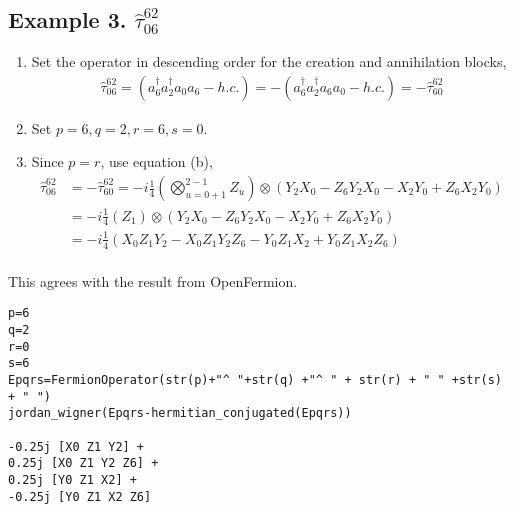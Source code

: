 \documentclass[prb,amsmath,amsfonts,amssymb]{revtex4}
\begin{document}
\subsection{Example 3. $\hat \tau_{06}^{62}$}
\begin{enumerate}
	\item Set the operator in descending order for the creation and annihilation blocks, 
\begin{align}\hat \tau_{06}^{62} =   \left(a_6^\dag a_2^\dag a_0 a_6 - h.c.\right) =  - \left(a_6^\dag a_2^\dag a_6 a_0 - h.c.\right)  = -\hat \tau_{60}^{62}
\end{align}	
\item Set $p = 6, q = 2, r=6, s=0$. 
\item Since $p=r$, use equation (b),
\begin{align}
\hat \tau_{06}^{62} &= -\hat \tau_{60}^{62} = -i\frac{1}{4} \left(\bigotimes_{u=0+1}^{2-1} Z_u\right)  \otimes \left( Y_2 X_0 - Z_6 Y_2 X_0 - X_2 Y_0 +Z_6 X_2 Y_0\right)\nonumber\\
&=- i\frac{1}{4}\left( Z_1\right)\otimes \left( Y_2 X_0 - Z_6 Y_2 X_0 - X_2 Y_0 +Z_6 X_2 Y_0\right)\nonumber\\
&=- i\frac{1}{4}\left( X_0 Z_1Y_2 - X_0 Z_1 Y_2 Z_6  - Y_0 Z_1 X_2 +Y_0Z_1X_2Z_6\right)\nonumber\\ 
 \end{align}
\end{enumerate}This agrees with the result from OpenFermion.

\begin{Verbatim}[frame=single, xleftmargin=4mm, xrightmargin=10mm]
p=6
q=2 
r=0
s=6 
Epqrs=FermionOperator(str(p)+"^ "+str(q) +"^ " + str(r) + " " +str(s) + " ") 
jordan_wigner(Epqrs-hermitian_conjugated(Epqrs))

-0.25j [X0 Z1 Y2] +
0.25j [X0 Z1 Y2 Z6] +
0.25j [Y0 Z1 X2] +
-0.25j [Y0 Z1 X2 Z6]
\end{Verbatim}

\newpage
\end{document}
